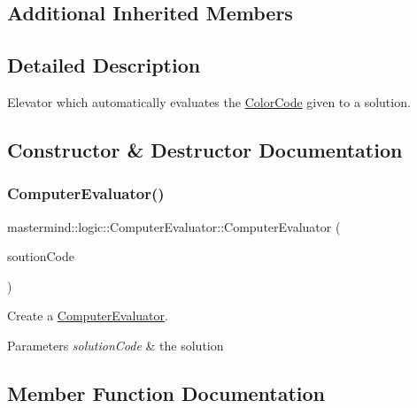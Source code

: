 \subsection*{Additional Inherited Members}


\subsection{Detailed Description}
Elevator which automatically evaluates the \hyperlink{classmastermind_1_1logic_1_1_color_code}{Color\+Code} given to a solution. 

\subsection{Constructor \& Destructor Documentation}
\hypertarget{classmastermind_1_1logic_1_1_computer_evaluator_ac0f1bd2144214ce313df69491b74e328}{}\label{classmastermind_1_1logic_1_1_computer_evaluator_ac0f1bd2144214ce313df69491b74e328} 
\subsubsection{\texorpdfstring{Computer\+Evaluator()}{ComputerEvaluator()}}
{\footnotesize\ttfamily mastermind\+::logic\+::\+Computer\+Evaluator\+::\+Computer\+Evaluator (\begin{DoxyParamCaption}\item[{\hyperlink{classmastermind_1_1logic_1_1_color_code}{Color\+Code}}]{soution\+Code }\end{DoxyParamCaption})}



Create a \hyperlink{classmastermind_1_1logic_1_1_computer_evaluator}{Computer\+Evaluator}. 


\begin{DoxyParams}{Parameters}
{\em solution\+Code} & the solution \\
\hline
\end{DoxyParams}


\subsection{Member Function Documentation}
\hypertarget{classmastermind_1_1logic_1_1_computer_evaluator_a579f808c46ab11077c4a3ce51838714b}{}\label{classmastermind_1_1logic_1_1_computer_evaluator_a579f808c46ab11077c4a3ce51838714b} 
